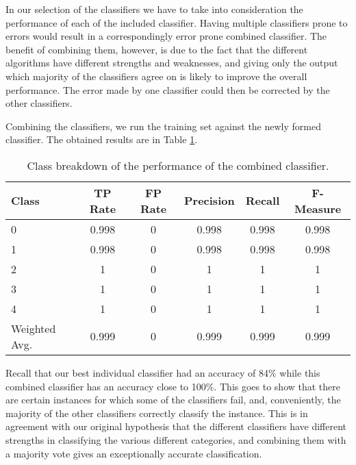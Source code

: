 \documentclass[12pt]{article}
\begin{document}
In our selection of the classifiers we have to take into consideration the performance of each of the included classifier. Having multiple classifiers prone to errors would result in a correspondingly error prone combined classifier. The benefit of combining them, however, is due to the fact that the different algorithms have different strengths and weaknesses, and giving only the output which majority of the classifiers agree on is likely to improve the overall performance. The error made by one classifier could then be corrected by the other classifiers.

Combining the classifiers, we run the training set against the newly formed classifier. The obtained results are in Table \ref{table:combi}.

\begin{table}[h]
\linespread{0.75}
\centering
\begin{tabular}{|l | c c c c c|}
\hline
Class &	TP Rate & FP Rate & Precision & Recall  & F-Measure	 \\
\hline

\hline
0             &     0.998   &   0   &        0.998   &   0.998   &   0.998  \\  
1             &     0.998   &   0   &        0.998   &   0.998   &   0.998  \\ 
2             &     1       &   0   &        1       &   1       &   1      \\ 
3             &     1       &   0   &        1       &   1       &   1      \\  
4             &     1       &   0   &        1       &   1       &   1      \\  
Weighted Avg. &     0.999   &   0   &        0.999   &   0.999   &   0.999  \\ 
\hline
\end{tabular}
\caption{Class breakdown of the performance of the combined classifier.}
\label{table:combi}
\end{table}
Recall that our best individual classifier had an accuracy of 84\% while this combined classifier has an accuracy close to 100\%. This goes to show that there are certain instances for which some of the classifiers fail, and, conveniently, the majority of the other classifiers correctly classify the instance. This is in agreement with our original hypothesis that the different classifiers have different strengths in classifying the various different categories, and combining them with a majority vote gives an exceptionally accurate classification.
\end{document}

